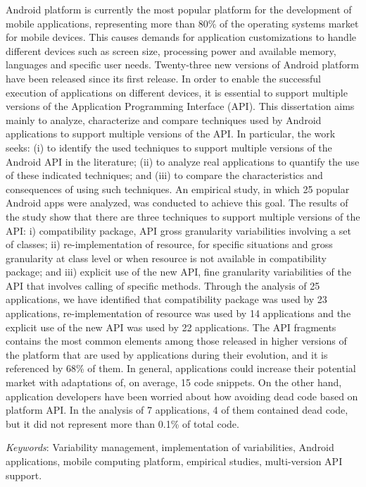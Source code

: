 \noindent Android platform is currently the most popular platform for the development
of mobile applications, representing more than 80\% of the operating systems market
for mobile devices. This causes demands for application customizations to handle
different devices such as screen size, processing power and available memory, languages
​​and specific user needs. Twenty-three new versions of Android platform have been
released since its first release. In order to enable the successful execution of
applications on different devices, it is essential to support multiple versions of
the Application Programming Interface (API). This dissertation aims mainly to analyze,
characterize and compare techniques used by Android applications to support multiple
versions of the API. In particular, the work seeks: (i) to identify the used techniques
to support multiple versions of the Android API in the literature; (ii) to analyze real
applications to quantify the use of these indicated techniques; and (iii) to compare the characteristics and consequences of using such techniques. An empirical study, in which
25 popular Android apps were analyzed, was conducted to achieve this goal. The results
of the study show that there are three techniques to support multiple versions of the
API: i) compatibility package, API gross granularity variabilities involving a set of
classes; ii) re-implementation of resource, for specific situations and gross granularity
at class level or when resource is not available in compatibility package; and iii)
explicit use of the new API, fine granularity variabilities of the API that involves
calling of specific methods. Through the analysis of 25 applications, we have identified
that compatibility package was used by 23 applications, re-implementation of resource was
used by 14 applications and the explicit use of the new API was used by 22 applications.
The API fragments contains the most common elements among those released in higher versions
of the platform that are used by applications during their evolution, and it is referenced
by 68\% of them. In general, applications could increase their potential market with adaptations
of, on average, 15 code snippets. On the other hand, application developers have been worried
about how avoiding dead code based on platform API. In the analysis of 7 applications, 4 of
them contained dead code, but it did not represent more than 0.1\% of total code.

\noindent\textit{Keywords}:  Variability management, implementation of variabilities,
Android applications, mobile computing platform, empirical studies, multi-version API support.
